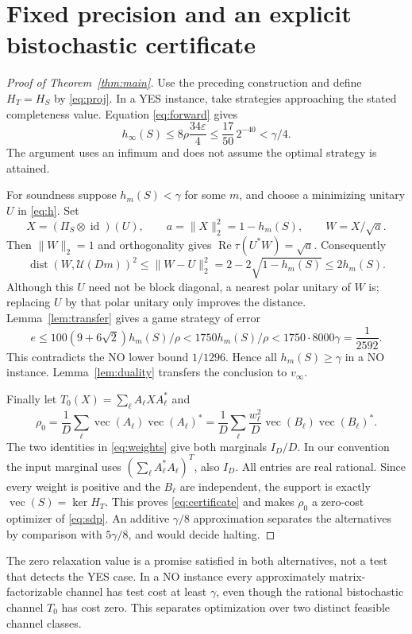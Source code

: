 \documentclass[11pt,a4paper]{article}
\newcommand{\id}{\operatorname{id}}
\newcommand{\vecop}{\operatorname{vec}}
\newcommand{\dist}{\operatorname{dist}}
\newcommand{\norm}[1]{\lVert#1\rVert}
\begin{document}
\section{Fixed precision and an explicit bistochastic certificate}
\begin{proof}[Proof of Theorem~\ref{thm:main}]
Use the preceding construction and define $H_T=H_S$ by \eqref{eq:proj}.
In a YES instance, take strategies approaching the stated completeness value. Equation \eqref{eq:forward} gives
\[
 h_\infty(S)\le8\rho\frac{34\varepsilon}{4}
 \le\frac{17}{50}\,2^{-40}<\gamma/4.
\]
The argument uses an infimum and does not assume the optimal strategy is attained.

For soundness suppose $h_m(S)<\gamma$ for some $m$, and choose a minimizing unitary $U$ in \eqref{eq:h}. Set
\[
 X=(\Pi_S\otimes\id)(U),\qquad a=\norm X_2^2=1-h_m(S),\qquad
 W=X/\sqrt a.
\]
Then $\norm W_2=1$ and orthogonality gives
$\operatorname{Re}\tau(U^*W)=\sqrt a$. Consequently
\begin{equation}
 \dist(W,\mathcal U(Dm))^2
 \le\norm{W-U}_2^2
 =2-2\sqrt{1-h_m(S)}\le2h_m(S).                     \label{eq:projectround}
\end{equation}
Although this $U$ need not be block diagonal, a nearest polar unitary of $W$ is; replacing $U$ by that polar unitary only improves the distance. Lemma~\ref{lem:transfer} gives a game strategy of error
\[
 e\le100(9+6\sqrt2)h_m(S)/\rho
 <1750h_m(S)/\rho
 <1750\cdot8000\gamma=\frac1{2592}.
\]
This contradicts the NO lower bound $1/1296$. Hence all $h_m(S)\ge\gamma$ in a NO instance. Lemma~\ref{lem:duality} transfers the conclusion to $v_\infty$.

Finally let $T_0(X)=\sum_\ell A_\ell XA_\ell^*$ and
\[
 \rho_0=\frac1D\sum_\ell\vecop(A_\ell)\vecop(A_\ell)^*
       =\frac1D\sum_\ell\frac{w_\ell^2}{D}
                       \vecop(B_\ell)\vecop(B_\ell)^*.
\]
The two identities in \eqref{eq:weights} give both marginals $I_D/D$.
In our convention the input marginal uses
$(\sum_\ell A_\ell^*A_\ell)^T$, also $I_D$. All entries are real rational.
Since every weight is positive and the $B_\ell$ are independent, the support is exactly $\vecop(S)=\ker H_T$. This proves \eqref{eq:certificate} and makes $\rho_0$ a zero-cost optimizer of \eqref{eq:sdp}. An additive $\gamma/8$ approximation separates the alternatives by comparison with $5\gamma/8$, and would decide halting.
\end{proof}

The zero relaxation value is a promise satisfied in both alternatives, not a test that detects the YES case. In a NO instance every approximately matrix-factorizable channel has test cost at least $\gamma$, even though the rational bistochastic channel $T_0$ has cost zero. This separates optimization over two distinct feasible channel classes.
\end{document}
